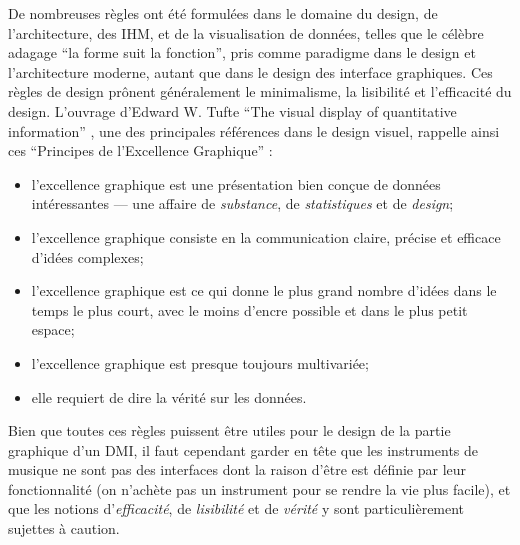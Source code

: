 \noindent De nombreuses règles ont été formulées dans le domaine du design, de l'architecture, des \gls{IHM}, et de la visualisation de données, telles que le célèbre adagage ``la forme suit la fonction'', pris comme paradigme dans le design et l'architecture moderne, autant que dans le design des interface graphiques. Ces règles de design prônent généralement le minimalisme, la lisibilité et l'efficacité du design. L'ouvrage d'Edward W. Tufte ``The visual display of quantitative information'' \cite{tufte_visual_2001}, une des principales références dans le design visuel, rappelle ainsi ces ``Principes de l'Excellence Graphique'' :
\vspace{-1em}
\begin{itemize}[noitemsep]
	\item l'excellence graphique est une présentation bien conçue de données intéressantes — une affaire de \textit{substance}, de \textit{statistiques} et de \textit{design};
	\item l'excellence graphique consiste en la communication claire, précise et efficace d'idées complexes;
	\item l'excellence graphique est ce qui donne le plus grand nombre d'idées dans le temps le plus court, avec le moins d'encre possible et dans le plus petit espace;
	\item l'excellence graphique est presque toujours multivariée;
	\item elle requiert de dire la vérité sur les données.
\end{itemize}

\noindent Bien que toutes ces règles puissent être utiles pour le design de la partie graphique d'un \gls{DMI}, il faut cependant garder en tête que les instruments de musique ne sont pas des interfaces dont la raison d'être est définie par leur fonctionnalité (on n'achète pas un instrument pour se rendre la vie plus facile), et que les notions d'\textit{efficacité}, de \textit{lisibilité} et de \textit{vérité} y sont particulièrement sujettes à caution.


